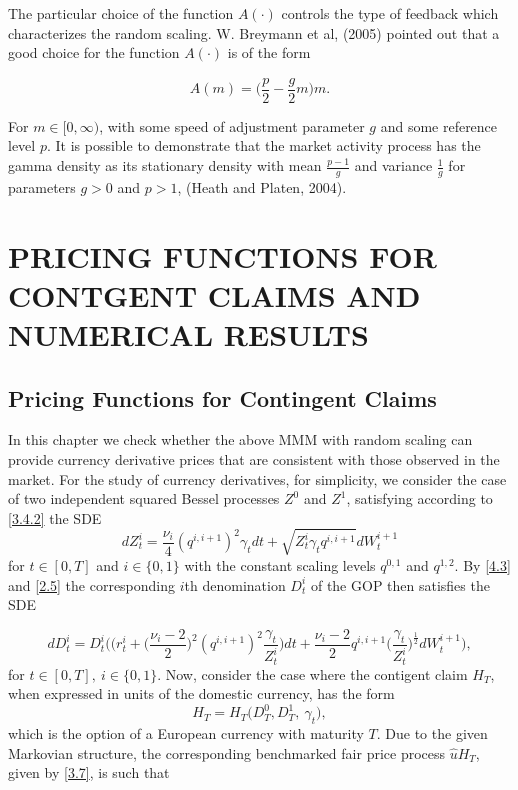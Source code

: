 \documentclass[a4 paper, 12pt]{report}
\theoremstyle{plain}
\begin{document}
The particular choice of the function $A(\cdot)$ controls the type of feedback which characterizes the random scaling. W. Breymann et al, (2005) pointed out that a good choice for the function $A(\cdot)$ is of the form

\begin{equation}\label{4.9}
A(m) = \bigg(\frac{p}{2}-\frac{g}{2}m\bigg)m.
\end{equation}

For $m\in[0,\infty)$, with some speed of adjustment parameter $g$ and some reference level $p$. It is possible to demonstrate that the market activity process has %
the gamma density as its stationary density with mean $\frac{p-1}{g}$ and variance $\frac{1}{g}$ for parameters  $g>0$ and $p>1$, (Heath and Platen, 2004).

\chapter{PRICING FUNCTIONS FOR CONTGENT CLAIMS AND NUMERICAL RESULTS}
\section{Pricing Functions for Contingent Claims}
\noindent
\par In this chapter we check whether the above MMM with random scaling can
provide currency derivative prices that are consistent with those observed in
the market. For the study of currency derivatives, for simplicity, we consider
the case of two independent squared Bessel processes $Z^0$ and $Z^1$, satisfying
according to \eqref{3.4.2} the SDE
\begin{equation}\label{4.1}
dZ_t^i = \frac{\nu_i}{4}(q^{i,i+1})^2\gamma_tdt+\sqrt{Z_t^i\gamma_tq^{i,i+1}}dW_t^{i+1}
\end{equation}
for $t\in[0,T]$ and $i\in \{0,1\}$ with the constant scaling levels $q^{0,1}$ and $q^{1,2}$. By \eqref{4.3} and \eqref{2.5} the corresponding $i$th denomination $D_t^i$ of the GOP then satisfies the SDE

\begin{equation}\label{5.2}
dD_t^i = D_t^i\bigg(\bigg(r_t^i+\bigg(\frac{\nu_i - 2}{2}\bigg)^2(q^{i,i+1})^2\frac{\gamma_t}{Z_t^i}\bigg)dt+\frac{\nu_i - 2}{2}q^{i,i+1}\bigg(\frac{\gamma_t}{Z_t^i}\bigg)^{\frac{1}{2}}dW_t^{i+1}\bigg),
\end{equation}
for $t\in[0,T],~ i\in\{0,1\}$. Now, consider the case where the contigent  claim $H_T$, when expressed in units of the domestic currency, has the form
\begin{equation}\label{5.3}
H_T = H_T\bigg(D_T^0, D_T^1,~\gamma_t\bigg),
\end{equation}
which is the option of a European currency with maturity $T$. Due to the given Markovian structure, the corresponding benchmarked fair price process $\hat{u}H_T$, given by \eqref{3.7}, is such that
\end{document}
